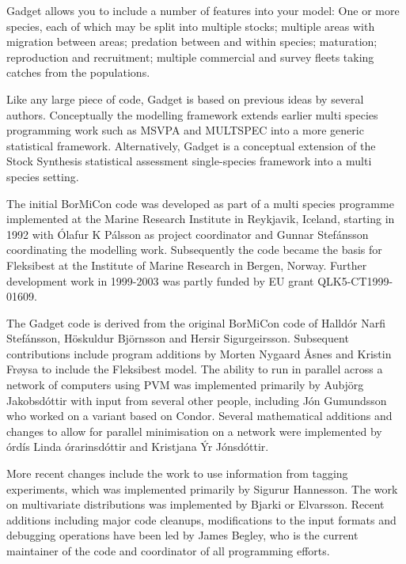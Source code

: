 \documentclass [a4paper, 10pt]{book}
\begin{document}
\bigskip
Gadget allows you to include a number of features into your model: One or more species, each of which may be split into multiple stocks; multiple areas with migration between areas; predation between and within species; maturation; reproduction and recruitment; multiple commercial and survey fleets taking catches from the populations.

\bigskip
Like any large piece of code, Gadget is based on previous ideas by several authors.  Conceptually the modelling framework extends earlier multi species programming work such as MSVPA and MULTSPEC into a more generic statistical framework.  Alternatively, Gadget is a conceptual extension of the Stock Synthesis statistical assessment single-species framework into a multi species setting.

\bigskip
The initial BorMiCon code was developed as part of a multi species programme implemented at the Marine Research Institute in Reykjavik, Iceland, starting in 1992 with \'{O}lafur K P\'{a}lsson as project coordinator and Gunnar Stef\'{a}nsson coordinating the modelling work.  Subsequently the code became the basis for Fleksibest at the Institute of Marine Research in Bergen, Norway.  Further development work in 1999-2003 was partly funded by EU grant QLK5-CT1999-01609.

\bigskip
The Gadget code is derived from the original BorMiCon code of Halld\'{o}r Narfi Stef\'{a}nsson, H\"{o}skuldur Bj\"{o}rnsson and Hersir Sigurgeirsson.  Subsequent contributions include program additions by Morten Nygaard {\AA}snes and Kristin Fr{\o}ysa to include the Fleksibest model.  The ability to run in parallel across a network of computers using PVM was implemented primarily by Au{\dh}bj\"{o}rg Jakobsd\'{o}ttir with input from several other people, including J\'{o}n Gu{\dh}mundsson who worked on a variant based on Condor.  Several mathematical additions and changes to allow for parallel minimisation on a network were implemented by {\TH}\'{o}rd\'{i}s Linda {\TH}\'{o}rarinsd\'{o}ttir and Kristjana \'{Y}r J\'{o}nsd\'{o}ttir.

\bigskip
More recent changes include the work to use information from tagging experiments, which was implemented primarily by Sigur{\dh}ur Hannesson.  The work on multivariate distributions was implemented by Bjarki {\TH}or Elvarsson.  Recent additions including major code cleanups, modifications to the input formats and debugging operations have been led by James Begley, who is the current maintainer of the code and coordinator of all programming efforts.
\end{document}
